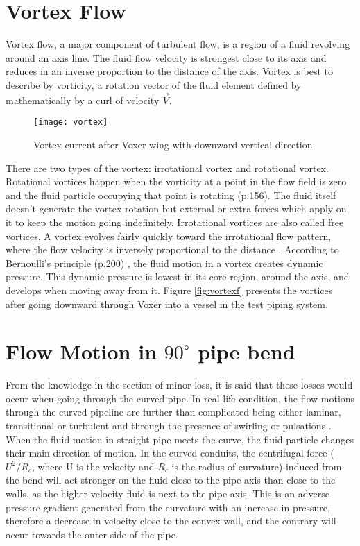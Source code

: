 \section{Vortex Flow}
Vortex flow, a major component of turbulent flow, is a region of a fluid revolving around an axis line. The fluid flow velocity is strongest close to its axis and reduces in an inverse proportion to the distance of the axis. 
Vortex is best to describe by vorticity, a rotation vector of the fluid element defined by mathematically by a curl of velocity $\vec{V}$. 
\begin{wrapfigure}{r}{0.5\textwidth}
  \begin{center}
  \texttt{[image: vortex]}
   \end{center}
  \caption{Vortex current after Voxer wing with downward vertical direction}
  \label{fig:vortexf}
\end{wrapfigure}
There are two types of the vortex: irrotational vortex and rotational vortex. Rotational vortices happen when the vorticity at a point in the flow field is zero and the fluid particle occupying that point is rotating (p.156)\cite{cengel:book}. The fluid itself doesn't generate the vortex rotation but external or extra forces which apply on it to keep the motion going indefinitely. 
Irrotational vortices are also called free vortices. A vortex evolves fairly quickly toward the irrotational flow pattern, where the flow velocity is inversely proportional to the distance \cite{wiki:web}.
According to Bernoulli's principle (p.200) \cite{cengel:book}, the fluid motion in a vortex creates dynamic pressure. This dynamic pressure is lowest in its core region, around the axis, and develops when moving away from it. Figure \vref{fig:vortexf} presents the vortices after going downward through Voxer into a vessel in the test piping system. 


\section{Flow Motion in $90^{\circ}$ pipe bend}
From the knowledge in the section of minor loss, it is said that these losses would occur when going through the curved pipe. In real life condition, the flow motions through the curved pipeline are further than complicated being either laminar, transitional or turbulent and through the presence of swirling or pulsations \cite{curve:article}. When the fluid motion in straight pipe meets the curve, the fluid particle changes their main direction of motion. In the curved conduits, the centrifugal force ($U^{2} / R_{c}$, where U is the velocity and $R_{c}$ is the radius of curvature) induced from the bend will act stronger on the fluid close to the pipe axis than close to the walls. as the higher velocity fluid is next to the pipe axis. This is an adverse pressure gradient generated from the curvature with an increase in pressure, therefore a decrease in velocity close to the convex wall, and the contrary will occur towards the outer side of the pipe. 

\clearpage %
